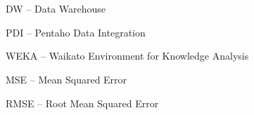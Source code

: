 \section*{} 

DW	–  	Data Warehouse

PDI	– 	Pentaho Data Integration 

WEKA	–	Waikato Environment for Knowledge Analysis

MSE    –   Mean Squared Error

RMSE    –   Root Mean Squared Error

